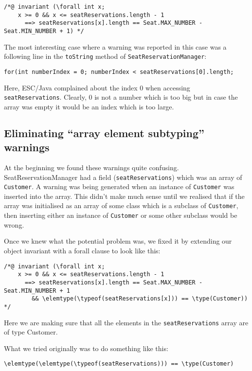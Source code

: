 \documentclass[11pt]{article}
\begin{document}
\noindent
\begin{verbatim}
/*@ invariant (\forall int x;
    x >= 0 && x <= seatReservations.length - 1
      ==> seatReservations[x].length == Seat.MAX_NUMBER - Seat.MIN_NUMBER + 1) */
\end{verbatim}

The most interesting case where a warning was reported in this case was a following line in the \verb|toString| method of \verb|SeatReservationManager|:

\begin{verbatim}
for(int numberIndex = 0; numberIndex < seatReservations[0].length;
\end{verbatim}

Here, ESC/Java complained about the index 0 when accessing \verb|seatReservations|. Clearly, 0 is not a number which is too big but in case the array was empty it would be an index which is too large.

\subsection{Eliminating ``array element subtyping'' warnings}

At the beginning we found these warnings quite confusing. SeatReservationManager had a field (\verb|seatReservations|) which was an array of \verb|Customer|. A warning was being generated when an instance of \verb|Customer| was inserted into the array. This didn't make much sense until we realised that if the array was initialised as an array of some class which is a subclass of \verb|Customer|, then inserting either an instance of \verb|Customer| or some other subclass would be wrong.

Once we knew what the potential problem was, we fixed it by extending our object invariant with a forall clause to look like this:

\noindent
\begin{verbatim}
/*@ invariant (\forall int x;
    x >= 0 && x <= seatReservations.length - 1
      ==> seatReservations[x].length == Seat.MAX_NUMBER - Seat.MIN_NUMBER + 1
        && \elemtype(\typeof(seatReservations[x])) == \type(Customer)) */
\end{verbatim}

Here we are making sure that all the elements in the \verb|seatReservations| array are of type Customer.

What we tried originally was to do something like this:

\begin{verbatim}
\elemtype(\elemtype(\typeof(seatReservations))) == \type(Customer)
\end{verbatim}
\end{document}
